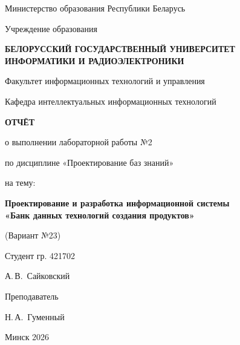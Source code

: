 \documentclass[14pt,a4paper]{extarticle}
\newcommand{\StudentGroup}{421702}
\newcommand{\StudentName}{А.\,В.~Сайковский}
\newcommand{\TeacherName}{Н.\,А.~Гуменный}
\newcommand{\VariantNumber}{23}
\begin{document}
\justifying
\pagestyle{plain}

\begin{titlepage}
\thispagestyle{empty}
\begin{center}
Министерство образования Республики Беларусь

Учреждение образования

\vspace{0.2cm}

\textbf{БЕЛОРУССКИЙ ГОСУДАРСТВЕННЫЙ УНИВЕРСИТЕТ}\\
\textbf{ИНФОРМАТИКИ И РАДИОЭЛЕКТРОНИКИ}

\vspace{0.3cm}

Факультет информационных технологий и управления

Кафедра интеллектуальных информационных технологий

\vfill

{\Large\textbf{ОТЧЁТ}}

\vspace{0.4cm}

о выполнении лабораторной работы №2

по дисциплине «Проектирование баз знаний»

\vspace{0.4cm}

на тему:

\vspace{0.3cm}

{\large\textbf{Проектирование и разработка информационной системы\\
«Банк данных технологий создания продуктов»}}

\vspace{0.3cm}

(Вариант №\VariantNumber)

\vfill
\end{center}

\begin{flushright}
\begin{minipage}{0.48\textwidth}
Студент гр. \StudentGroup

\StudentName

\vspace{0.6cm}

Преподаватель

\TeacherName
\end{minipage}
\end{flushright}

\vfill

\begin{center}
Минск 2026
\end{center}
\end{titlepage}
\end{document}
